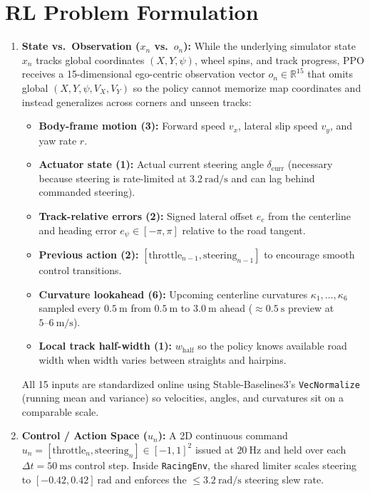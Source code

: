 \documentclass[11pt]{article}
\begin{document}
\section{RL Problem Formulation}
\begin{enumerate}[leftmargin=1.5em, itemsep=0.35em]
    \item \textbf{State vs.\ Observation ($x_n$ vs.\ $o_n$):} While the underlying simulator state $x_n$ tracks global coordinates $(X, Y, \psi)$, wheel spins, and track progress, PPO receives a 15-dimensional ego-centric observation vector $o_n \in \mathbb{R}^{15}$ that omits global $(X, Y, \psi, V_X, V_Y)$ so the policy cannot memorize map coordinates and instead generalizes across corners and unseen tracks:
    \begin{itemize}[leftmargin=1.5em, itemsep=0.15em]
        \item \textbf{Body-frame motion (3):} Forward speed $v_x$, lateral slip speed $v_y$, and yaw rate $r$.
        \item \textbf{Actuator state (1):} Actual current steering angle $\delta_{\text{curr}}$ (necessary because steering is rate-limited at $3.2~\text{rad/s}$ and can lag behind commanded steering).
        \item \textbf{Track-relative errors (2):} Signed lateral offset $e_c$ from the centerline and heading error $e_\psi \in [-\pi, \pi]$ relative to the road tangent.
        \item \textbf{Previous action (2):} $[\text{throttle}_{n-1}, \text{steering}_{n-1}]$ to encourage smooth control transitions.
        \item \textbf{Curvature lookahead (6):} Upcoming centerline curvatures $\kappa_1, \dots, \kappa_6$ sampled every $0.5~\text{m}$ from $0.5~\text{m}$ to $3.0~\text{m}$ ahead ($\approx 0.5~\text{s}$ preview at $5\text{--}6~\text{m/s}$).
        \item \textbf{Local track half-width (1):} $w_{\text{half}}$ so the policy knows available road width when width varies between straights and hairpins.
    \end{itemize}
    All 15 inputs are standardized online using Stable-Baselines3's \texttt{VecNormalize} (running mean and variance) so velocities, angles, and curvatures sit on a comparable scale.

    \item \textbf{Control / Action Space ($u_n$):} A 2D continuous command $u_n = [\text{throttle}_n, \text{steering}_n] \in [-1, 1]^2$ issued at $20~\text{Hz}$ and held over each $\Delta t = 50~\text{ms}$ control step. Inside \texttt{RacingEnv}, the shared limiter scales steering to $[-0.42, 0.42]~\text{rad}$ and enforces the $\le 3.2~\text{rad/s}$ steering slew rate.


\end{enumerate}
\end{document}
